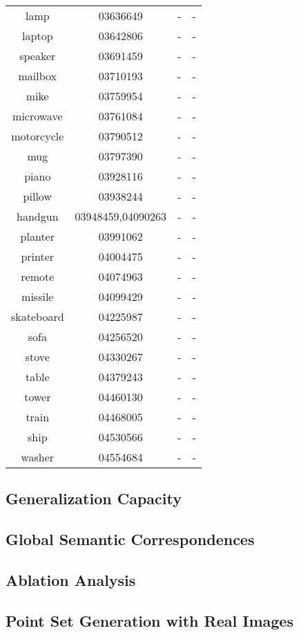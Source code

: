 \begin{table*}
\begin{tabular}{c c c c}
		lamp & 03636649 & - &-\\
		laptop & 03642806 & - &-\\
		speaker & 03691459 & - &-\\
		mailbox & 03710193 & - &-\\
		mike & 03759954 & - & -\\
		microwave & 03761084 & - & -\\
		motorcycle & 03790512 & - & -\\
		mug & 03797390 & - &-\\
		piano & 03928116 & -  & - \\
		pillow & 03938244 & - &-\\
		handgun & 03948459,04090263 & - & -\\
		planter & 03991062 & - & -\\
		printer & 04004475 & - & -\\
		remote & 04074963 & - & -\\
		missile & 04099429 & - & -\\
		skateboard & 04225987 & - &-\\
		sofa & 04256520 & - & -\\
		stove & 04330267 & - & -\\
		table & 04379243 & - & -\\
		tower & 04460130 & - & -\\
		train & 04468005 & - & -\\
		ship  & 04530566 & - & -\\
		washer &  04554684 & - & -\\
	\end{tabular}
	\label{tab:seg}
\end{table*}

\subsection{Generalization Capacity}
\subsection{Global Semantic Correspondences}
\subsection{Ablation Analysis}
\subsection{Point Set Generation with Real Images}